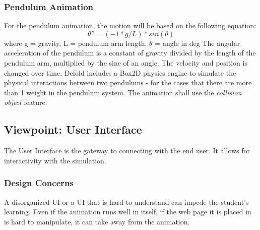 \documentclass[onecolumn, draftclsnofoot,10pt, compsoc]{IEEEtran}
\begin{document}
\subsubsection{Pendulum Animation}
For the pendulum animation, the motion will be based on the following equation:
\begin{equation}
    \theta'' = (-1 * g/L)*sin(\theta)
\end{equation}
 where g = gravity, L = pendulum arm length, $\theta$ = angle in deg \newline
The angular acceleration of the pendulum is a constant of gravity divided by the length of the pendulum arm, multiplied by the sine of an angle. The velocity and position is changed over time.
Defold includes a Box2D physics engine to simulate the physical interactions between two pendulums - for the cases that there are more than 1 weight in the pendulum system. The animation shall use the \textit{collision object} feature. 





\subsection{Viewpoint: User Interface}
The User Interface is the gateway to connecting with the end user. It allows for interactivity with the simulation.

\subsubsection{Design Concerns}
A disorganized UI or a UI that is hard to understand can impede the student's learning. Even if the animation runs well in itself, if the web page it is placed in is hard to manipulate, it can take away from the animation. 
\end{document}
